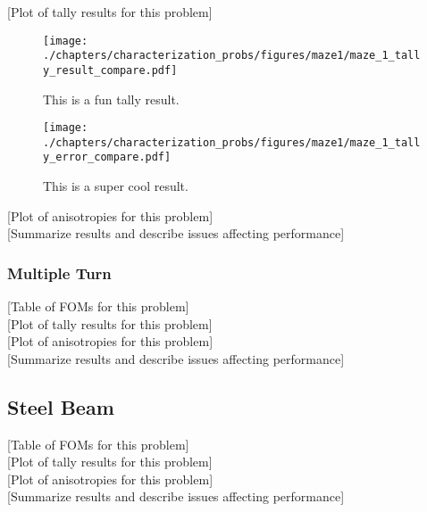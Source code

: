 [Plot of tally results for this problem] \\

\begin{figure}[h!]
  \centering
  \texttt{[image: ./chapters/characterization\_probs/figures/maze1/maze\_1\_tally\_result\_compare.pdf]}
  \caption[Tally results comparison between methods for single turn labyrinth.]
  {This is a fun tally result.}
  \label{fig:maze1result}
\end{figure}

\begin{figure}[h!]
  \centering
  \texttt{[image: ./chapters/characterization\_probs/figures/maze1/maze\_1\_tally\_error\_compare.pdf]}
  \caption[Tally relative error comparison between methods for single turn
  labyrinth]{This is a super cool result.}
  \label{fig:maze1result}
\end{figure}
[Plot of anisotropies for this problem] \\

[Summarize results and describe issues affecting performance] \\

\subsubsection{Multiple Turn}
[Table of FOMs for this problem]\\

[Plot of tally results for this problem]\\

[Plot of anisotropies for this problem] \\

[Summarize results and describe issues affecting performance] \\

\subsection{Steel Beam}
\label{subsec:resultbeam}
[Table of FOMs for this problem] \\

[Plot of tally results for this problem] \\

[Plot of anisotropies for this problem] \\

[Summarize results and describe issues affecting performance] \\

